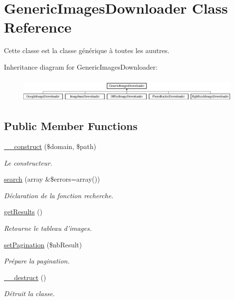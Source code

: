\hypertarget{class_generic_images_downloader}{\section{Generic\-Images\-Downloader Class Reference}
\label{class_generic_images_downloader}
}


Cette classe est la classe générique à toutes les auutres.  


Inheritance diagram for Generic\-Images\-Downloader\-:\begin{figure}[H]
\begin{center}
\leavevmode
\includegraphics[height=1.287356cm]{class_generic_images_downloader}
\end{center}
\end{figure}
\subsection*{Public Member Functions}
\begin{DoxyCompactItemize}
\item 
\hyperlink{class_generic_images_downloader_a1df9ccba19fdd7050e21d302c7f58d35}{\-\_\-\-\_\-construct} (\$domain, \$path)
\begin{DoxyCompactList}\small\item\em Le constructeur. \end{DoxyCompactList}\item 
\hyperlink{class_generic_images_downloader_aeaf78020730e78dd35d16d14b527b44c}{search} (array \&\$errors=array())
\begin{DoxyCompactList}\small\item\em Déclaration de la fonction recherche. \end{DoxyCompactList}\item 
\hyperlink{class_generic_images_downloader_a3813247f2eae6ac65a8a021daf05bae4}{get\-Results} ()
\begin{DoxyCompactList}\small\item\em Retourne le tableau d'images. \end{DoxyCompactList}\item 
\hyperlink{class_generic_images_downloader_ae56b5f60923f542064ba1aae8b2af268}{set\-Pagination} (\$nb\-Result)
\begin{DoxyCompactList}\small\item\em Prépare la pagination. \end{DoxyCompactList}\item 
\hypertarget{class_generic_images_downloader_a421831a265621325e1fdd19aace0c758}{\hyperlink{class_generic_images_downloader_a421831a265621325e1fdd19aace0c758}{\-\_\-\-\_\-destruct} ()}\label{class_generic_images_downloader_a421831a265621325e1fdd19aace0c758}

\begin{DoxyCompactList}\small\item\em Détruit la classe. \end{DoxyCompactList}\end{DoxyCompactItemize}
